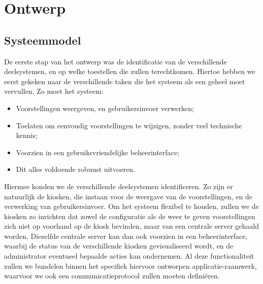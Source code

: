 \part{Ontwerp}
\label{ontwerp}

%
%

\chapter{Systeemmodel}
\label{ontwerp:systeemmodel}

De eerste stap van het ontwerp was de identificatie van de verschillende deelsystemen, en op welke toestellen die zullen terechtkomen. Hiertoe hebben we eerst gekeken naar de verschillende taken die het systeem als een geheel moet vervullen. Zo moet het systeem:
\begin{itemize}
\item Voorstellingen weergeven, en gebruikersinvoer verwerken;
\item Toelaten om eenvoudig voorstellingen te wijzigen, zonder veel technische kennis;
\item Voorzien in een gebruiksvriendelijke beheerinterface;
\item Dit alles voldoende robuust uitvoeren.
\end{itemize}

Hiermee konden we de verschillende deelsystemen identificeren. Zo zijn er natuurlijk de kiosken, die instaan voor de weergave van de voorstellingen, en de verwerking van gebruikersinvoer. Om het systeem flexibel te houden, zullen we de kiosken zo inrichten dat zowel de configuratie als de weer te geven voorstellingen zich niet op voorhand op de kiosk bevinden, maar van een centrale server gehaald worden. Diezelfde centrale server kan dan ook voorzien in een beheerinterface, waarbij de status van de verschillende kiosken gevisualiseerd wordt, en de administrator eventueel bepaalde acties kan ondernemen. Al deze functionaliteit zullen we bundelen binnen het specifiek hiervoor ontworpen applicatie-raamwerk, waarvoor we ook een communicatieprotocol zullen moeten definiëren.

